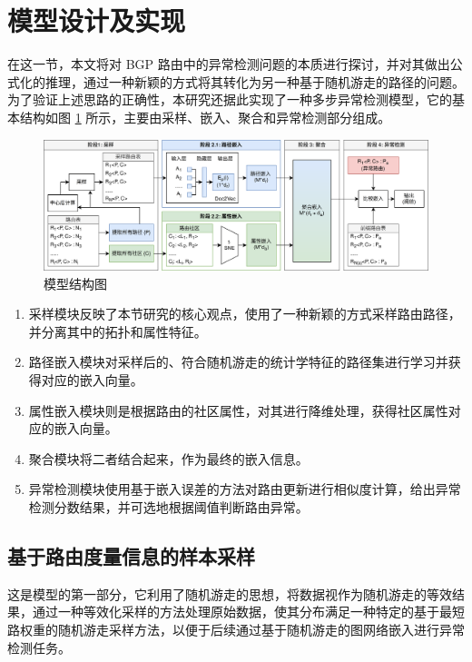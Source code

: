 \section{模型设计及实现}


在这一节，本文将对 BGP 路由中的异常检测问题的本质进行探讨，并对其做出公式化的推理，通过一种新颖的方式将其转化为另一种基于随机游走的路径的问题。为了验证上述思路的正确性，本研究还据此实现了一种多步异常检测模型，它的基本结构如图 \ref{c5-model} 所示，主要由采样、嵌入、聚合和异常检测部分组成。

\begin{figure}[h]
    \includegraphics[width=\linewidth]{chapter/c5_images/c5_model.png}
    \caption{模型结构图}
    \label{c5-model}
\end{figure}

\begin{enumerate}
    \item 采样模块反映了本节研究的核心观点，使用了一种新颖的方式采样路由路径，并分离其中的拓扑和属性特征。
    \item 路径嵌入模块对采样后的、符合随机游走的统计学特征的路径集进行学习并获得对应的嵌入向量。
    \item 属性嵌入模块则是根据路由的社区属性，对其进行降维处理，获得社区属性对应的嵌入向量。
    \item 聚合模块将二者结合起来，作为最终的嵌入信息。
    \item 异常检测模块使用基于嵌入误差的方法对路由更新进行相似度计算，给出异常检测分数结果，并可选地根据阈值判断路由异常。
\end{enumerate}

\subsection{基于路由度量信息的样本采样}

这是模型的第一部分，它利用了随机游走的思想，将数据视作为随机游走的等效结果，通过一种等效化采样的方法处理原始数据，使其分布满足一种特定的基于最短路权重的随机游走采样方法，以便于后续通过基于随机游走的图网络嵌入进行异常检测任务。

